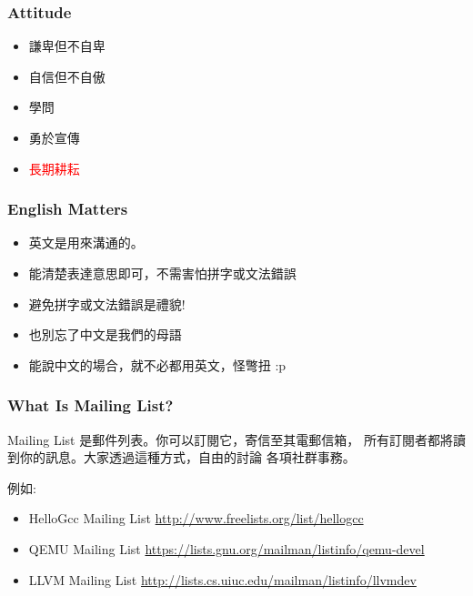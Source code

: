 \documentclass[CJK]{beamer}
\begin{document}
\begin{CJK}{UTF8}{bkai}
\begin{frame}
  \frametitle{Attitude}

\begin{itemize}
  \item 謙卑但不自卑
  \item 自信但不自傲
  \item 學問
  \item 勇於宣傳
  \item \textcolor{red}{長期耕耘}
\end{itemize}

\end{frame}


\begin{frame}
  \frametitle{English Matters}

\begin{itemize}
  \item 英文是用來溝通的。
  \item 能清楚表達意思即可，不需害怕拼字或文法錯誤
  \item 避免拼字或文法錯誤是禮貌!
  \item 也別忘了中文是我們的母語
  \item 能說中文的場合，就不必都用英文，怪彆扭 :p
\end{itemize}

\end{frame}


\begin{frame}
  \frametitle{What Is Mailing List?}

Mailing List 是郵件列表。你可以訂閱它，寄信至其電郵信箱，
所有訂閱者都將讀到你的訊息。大家透過這種方式，自由的討論
各項社群事務。

\medskip
例如:
\begin{itemize}
  \item HelloGcc Mailing List \href{http://www.freelists.org/list/hellogcc}{http://www.freelists.org/list/hellogcc}
  \item QEMU Mailing List \href{https://lists.gnu.org/mailman/listinfo/qemu-devel}{https://lists.gnu.org/mailman/listinfo/qemu-devel}
  \item LLVM Mailing List \href{http://lists.cs.uiuc.edu/mailman/listinfo/llvmdev}{http://lists.cs.uiuc.edu/mailman/listinfo/llvmdev}
\end{itemize}


\end{frame}
\end{CJK}
\end{document}
